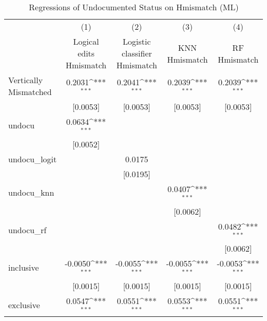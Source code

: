 \begin{table}[htbp]\centering
\def\sym#1{\ifmmode^{#1}\else\(^{#1}\)\fi}
\caption{Regressions of Undocumented Status on Hmismatch (ML)}
\begin{tabular}{l*{4}{c}}
\toprule
                    &\multicolumn{1}{c}{(1)}         &\multicolumn{1}{c}{(2)}         &\multicolumn{1}{c}{(3)}         &\multicolumn{1}{c}{(4)}         \\
                    &Logical edits Hmismatch         &Logistic classifier Hmismatch         &KNN Hmismatch         &RF Hmismatch         \\
\midrule
Vertically Mismatched&      0.2031\sym{***}&      0.2041\sym{***}&      0.2039\sym{***}&      0.2039\sym{***}\\
                    &    [0.0053]         &    [0.0053]         &    [0.0053]         &    [0.0053]         \\
\addlinespace
undocu              &      0.0634\sym{***}&                     &                     &                     \\
                    &    [0.0052]         &                     &                     &                     \\
\addlinespace
undocu\_logit        &                     &      0.0175         &                     &                     \\
                    &                     &    [0.0195]         &                     &                     \\
\addlinespace
undocu\_knn          &                     &                     &      0.0407\sym{***}&                     \\
                    &                     &                     &    [0.0062]         &                     \\
\addlinespace
undocu\_rf           &                     &                     &                     &      0.0482\sym{***}\\
                    &                     &                     &                     &    [0.0062]         \\
\addlinespace
inclusive           &     -0.0050\sym{***}&     -0.0055\sym{***}&     -0.0055\sym{***}&     -0.0053\sym{***}\\
                    &    [0.0015]         &    [0.0015]         &    [0.0015]         &    [0.0015]         \\
\addlinespace
exclusive           &      0.0547\sym{***}&      0.0551\sym{***}&      0.0553\sym{***}&      0.0551\sym{***}\\

\end{tabular}
\end{table}

